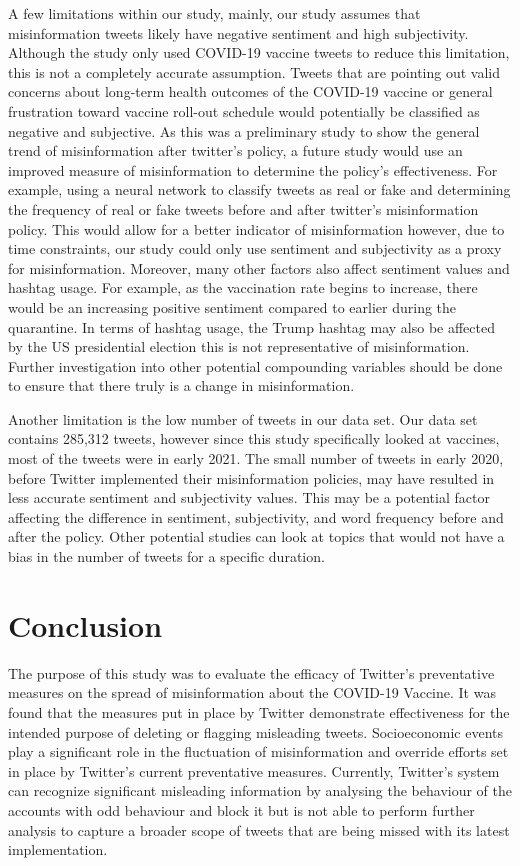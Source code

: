 \documentclass[10pt,twocolumn,letterpaper]{article}
\begin{document}
A few limitations within our study, mainly, our study assumes that misinformation tweets likely have negative sentiment and high subjectivity. Although the study only used COVID-19 vaccine tweets to reduce this limitation, this is not a completely accurate assumption. Tweets that are pointing out valid concerns about long-term health outcomes of the COVID-19 vaccine or general frustration toward vaccine roll-out schedule would potentially be classified as negative and subjective. As this was a preliminary study to show the general trend of misinformation after twitter’s policy, a future study would use an improved measure of misinformation to determine the policy’s effectiveness. For example, using a neural network to classify tweets as real or fake and determining the frequency of real or fake tweets before and after twitter’s misinformation policy. This would allow for a better indicator of misinformation however, due to time constraints, our study could only use sentiment and subjectivity as a proxy for misinformation. Moreover, many other factors also affect sentiment values and hashtag usage. For example, as the vaccination rate begins to increase, there would be an increasing positive sentiment compared to earlier during the quarantine. In terms of hashtag usage, the Trump hashtag may also be affected by the US presidential election this is not representative of misinformation. Further investigation into other potential compounding variables should be done to ensure that there truly is a change in misinformation.

Another limitation is the low number of tweets in our data set. Our data set contains 285,312 tweets, however since this study specifically looked at vaccines, most of the tweets were in early 2021. The small number of tweets in early 2020, before Twitter implemented their misinformation policies, may have resulted in less accurate sentiment and subjectivity values. This may be a potential factor affecting the difference in sentiment, subjectivity, and word frequency before and after the policy. Other potential studies can look at topics that would not have a bias in the number of tweets for a specific duration. 


\section*{Conclusion}

The purpose of this study was to evaluate the efficacy of Twitter's preventative measures on the spread of misinformation about the COVID-19 Vaccine. It was found that the measures put in place by Twitter demonstrate effectiveness for the intended purpose of deleting or flagging misleading tweets. Socioeconomic events play a significant role in the fluctuation of misinformation and override efforts set in place by Twitter’s current preventative measures. Currently, Twitter’s system can recognize significant misleading information by analysing the behaviour of the accounts with odd behaviour and block it but is not able to perform further analysis to capture a broader scope of tweets that are being missed with its latest implementation\cite{inc_2021}.
\end{document}
